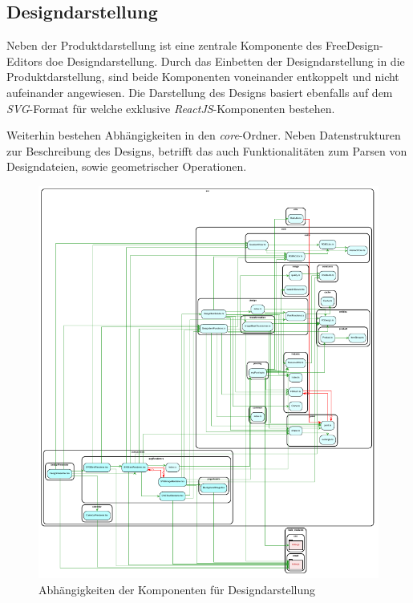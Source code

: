 
\subsection{Designdarstellung}
Neben der Produktdarstellung ist eine zentrale Komponente des FreeDesign-Editors doe Designdarstellung.
Durch das Einbetten der Designdarstellung in die Produktdarstellung, sind beide Komponenten voneinander entkoppelt und nicht aufeinander angewiesen. Die Darstellung des Designs basiert ebenfalls auf dem \textit{SVG}-Format für welche exklusive \textit{ReactJS}-Komponenten bestehen.

Weiterhin bestehen Abhängigkeiten in den \textit{core}-Ordner. Neben Datenstrukturen zur Beschreibung des Designs, betrifft das auch Funktionalitäten zum Parsen von Designdateien, sowie geometrischer Operationen. 


\begin{figure}[H]
    \centering
    \includegraphics{diagrams/Ist-Architektur/design-presenter-analysis.pdf}
    \caption{Abhängigkeiten der Komponenten für Designdarstellung}
    \label{fig:Designdarstellung}
\end{figure}
\begin{multicols}{2}

\end{multicols}